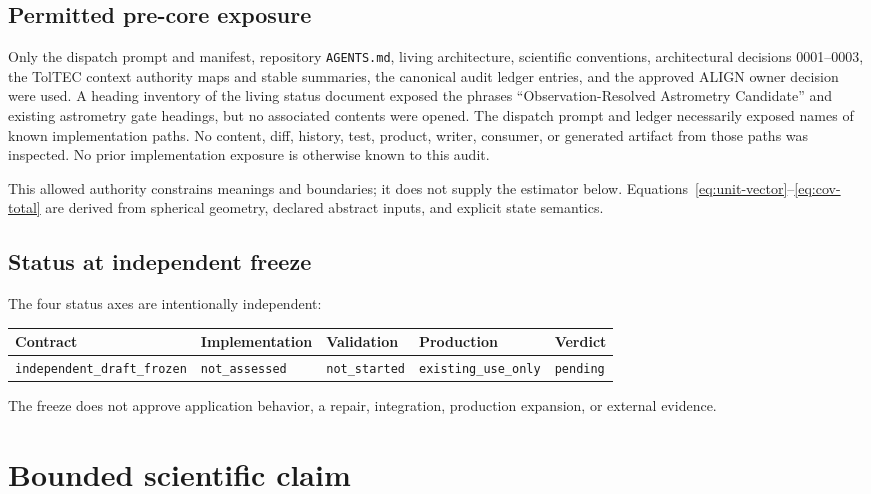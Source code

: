 \documentclass[11pt]{article}
\begin{document}
\subsection{Permitted pre-core exposure}

Only the dispatch prompt and manifest, repository \texttt{AGENTS.md}, living
architecture, scientific conventions, architectural decisions 0001--0003,
the TolTEC context authority maps and stable summaries, the canonical audit
ledger entries, and the approved ALIGN owner decision were used.  A heading
inventory of the living status document exposed the phrases
``Observation-Resolved Astrometry Candidate'' and existing astrometry gate
headings, but no associated contents were opened.  The dispatch prompt and
ledger necessarily exposed names of known implementation paths.  No content,
diff, history, test, product, writer, consumer, or generated artifact from
those paths was inspected.  No prior implementation exposure is otherwise
known to this audit.

This allowed authority constrains meanings and boundaries; it does not supply
the estimator below.  Equations~\eqref{eq:unit-vector}--\eqref{eq:cov-total}
are derived from spherical geometry, declared abstract inputs, and explicit
state semantics.

\subsection{Status at independent freeze}

The four status axes are intentionally independent:

\begin{center}
\begin{tabular}{lllll}
\toprule
Contract & Implementation & Validation & Production & Verdict \\
\midrule
\texttt{independent\_draft\_frozen} & \texttt{not\_assessed} &
\texttt{not\_started} & \texttt{existing\_use\_only} & \texttt{pending} \\
\bottomrule
\end{tabular}
\end{center}

The freeze does not approve application behavior, a repair, integration,
production expansion, or external evidence.

\section{Bounded scientific claim}
\end{document}
